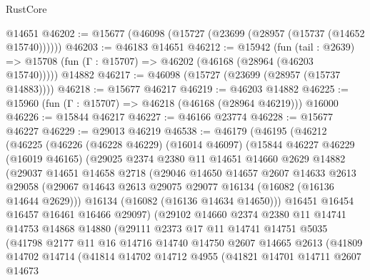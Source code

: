 \begin{lexlean}{RustCore}
\begin{coremodule}
    @14651
@46202 := @15677 (@46098 (@15727 (@23699 (@28957 (@15737 (@14652 @15740))))))
@46203 := @46183 @14651
@46212 := @15942
    (fun (tail : @2639) => @15708 (fun (Γ : @15707) => @46202 (@46168 (@28964 (@46203 @15740)))))
    @14882
@46217 := @46098 (@15727 (@23699 (@28957 (@15737 @14883))))
@46218 := @15677 @46217
@46219 := @46203 @14882
@46225 := @15960 (fun (Γ : @15707) => @46218 (@46168 (@28964 @46219))) @16000
@46226 := @15844 @46217
@46227 := @46166 @23774
@46228 := @15677 @46227
@46229 := @29013 @46219
@46538 := @46179
    (@46195
      (@46212
        (@46225
          (@46226
            (@46228 @46229)
            (@16014 @46097)
            (@15844
              @46227
              @46229
              (@16019 @46165)
              (@29025
                @2374
                @2380
                @11
                @14651
                @14660
                @2629
                @14882
                (@29037
                  @14651
                  @14658
                  @2718
                  (@29046
                    @14650
                    @14657
                    @2607
                    @14633
                    @2613
                    @29058
                    (@29067 @14643 @2613 @29075 @29077 @16134 (@16082 (@16136 @14644 @2629)))
                    @16134
                    (@16082 (@16136 @14634 @14650)))
                  @16451
                  @16454
                  @16457
                  @16461
                  @16466
                  @29097)
                (@29102
                  @14660
                  @2374
                  @2380
                  @11
                  @14741
                  @14753
                  @14868
                  @14880
                  (@29111
                    @2373
                    @17
                    @11
                    @14741
                    @14751
                    @5035
                    (@41798
                      @2177
                      @11
                      @16
                      @14716
                      @14740
                      @14750
                      @2607
                      @14665
                      @2613
                      (@41809
                        @14702
                        @14714
                        (@41814
                          @14702
                          @14712
                          @4955
                          (@41821
                            @14701
                            @14711
                            @2607
                            @14673

\end{coremodule}
\end{lexlean}
